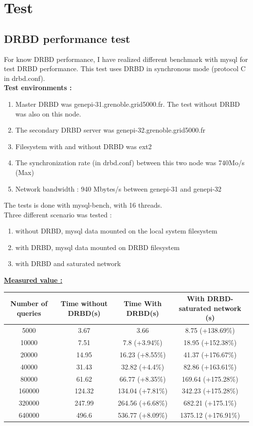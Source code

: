 \documentclass[a4paper,10pt]{report}
\begin{document}
\chapter{Test}

\section{DRBD performance test}

For know DRBD performance, I have realized different benchmark with mysql for test DRBD performance. This test uses DRBD in synchronous mode (protocol C in drbd.conf).\\
\textbf{Test environments :}
\begin{enumerate}
 \item Master DRBD was genepi-31.grenoble.grid5000.fr. The test without DRBD was also on this node.
 \item The secondary DRBD server was genepi-32.grenoble.grid5000.fr 
 \item Filesystem with and without DRBD was ext2
 \item The synchronization rate (in drbd.conf) between this two node was 740Mo/s (Max)
 \item Network bandwidth : 940 Mbytes/s between genepi-31 and genepi-32
\end{enumerate}
The tests is done with mysql-bench, with 16 threads.\\

Three different scenario was tested :
\begin{enumerate}
 \item without DRBD, mysql data mounted on the local system filesystem 
 \item with DRBD, mysql data mounted on DRBD filesystem 
 \item with DRBD and saturated network 
\end{enumerate}

\bigskip 

\underline{\textbf{Measured value :}}\\

\begin{tabular}{|c|c|c|c|}
\hline
Number of queries&Time without DRBD(s)&Time With DRBD(s)&With DRBD-saturated network (s)\\
\hline
5000 & 3.67 & 3.66 & 8.75 (+138.69\%)\\
\hline
10000 & 7.51 & 7.8 (+3.94\%)& 18.95 (+152.38\%)\\
\hline
20000 & 14.95 & 16.23 (+8.55\%)& 41.37 (+176.67\%)\\
\hline
40000 & 31.43 & 32.82 (+4.4\%) & 82.86 (+163.61\%)\\
\hline
80000 & 61.62 & 66.77 (+8.35\%)& 169.64 (+175.28\%)\\
\hline
160000 & 124.32 & 134.04 (+7.81\%)& 342.23 (+175.28\%)\\
\hline
320000 & 247.99 & 264.56 (+6.68\%)& 682.21 (+175.1\%)\\
\hline
640000 & 496.6 & 536.77 (+8.09\%)& 1375.12 (+176.91\%)\\
\hline
\end{tabular}
\end{document}
